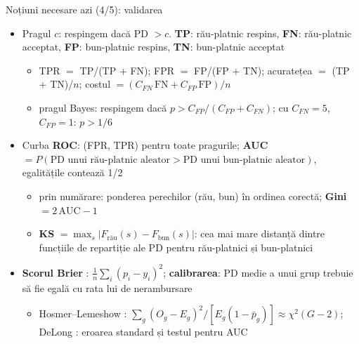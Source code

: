 \begin{frame}{Noțiuni necesare azi (4/5): validarea}
\itemsize{\footnotesize}
\begin{itemize}
    \item Pragul $c$: respingem dacă PD $> c$. \textbf{TP}: rău-platnic respins, \textbf{FN}: rău-platnic acceptat, \textbf{FP}: bun-platnic respins, \textbf{TN}: bun-platnic acceptat
    \begin{itemize}
        \item TPR $= $ TP/(TP + FN); FPR $= $ FP/(FP + TN); acuratețea $=$ (TP + TN)/$n$; costul $= (C_{FN}\,\mathrm{FN} + C_{FP}\,\mathrm{FP})/n$
        \item pragul Bayes: respingem dacă $p > C_{FP}/(C_{FP} + C_{FN})$; cu $C_{FN} = 5$, $C_{FP} = 1$: $p > 1/6$
    \end{itemize}
    \item Curba \textbf{ROC}: (FPR, TPR) pentru toate pragurile; \textbf{AUC} $= P(\text{PD unui rău-platnic aleator} > \text{PD unui bun-platnic aleator})$, egalitățile contează 1/2 
    \begin{itemize}
        \item prin numărare: ponderea perechilor (rău, bun) în ordinea corectă; \textbf{Gini} $= 2\,\mathrm{AUC} - 1$
        \item \textbf{KS} $= \max_s |F_{\text{rău}}(s) - F_{\text{bun}}(s)|$: cea mai mare distanță dintre funcțiile de repartiție ale PD pentru rău-platnici și bun-platnici
    \end{itemize}
    \item \textbf{Scorul Brier} : $\frac1n\sum_i (p_i - y_i)^2$; \textbf{calibrarea}: PD medie a unui grup trebuie să fie egală cu rata lui de nerambursare
    \begin{itemize}
        \item Hosmer--Lemeshow : $\sum_g (O_g - E_g)^2/[E_g(1 - \bar p_g)] \approx \chi^2(G - 2)$; DeLong : eroarea standard și testul pentru AUC
    \end{itemize}
\end{itemize}
\end{frame}

